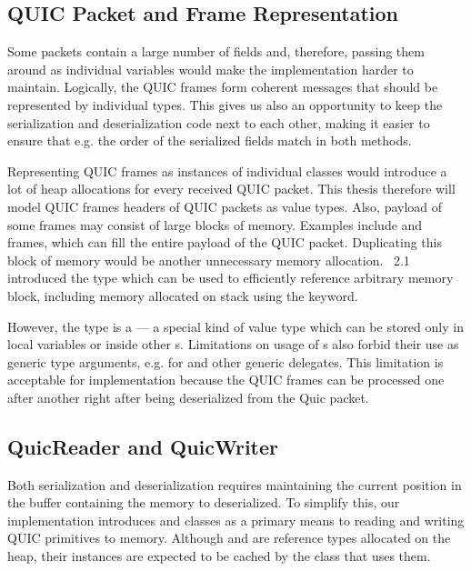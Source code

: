 \subsection{QUIC Packet and Frame Representation}\label{sec:03-data-representation}


Some packets contain a large number of fields and, therefore, passing them around as individual
variables would make the implementation harder to maintain. Logically, the QUIC frames form coherent
messages that should be represented by individual \dotnet{} types. This gives us also an opportunity to keep the serialization and deserialization code next to each other, making it easier to ensure that e.g. the order of the serialized fields match in both methods.

Representing QUIC frames as instances of individual classes would introduce a lot of heap
allocations for every received QUIC packet. This thesis therefore will model QUIC frames headers of
QUIC packets as value types. Also, payload of some frames may consist of large blocks of memory.
Examples include \STREAM{} and \CRYPTO{} frames, which can fill the entire payload of the QUIC
packet. Duplicating this block of memory would be another unnecessary memory allocation.
\dotnet{}~2.1 introduced the  type which can be used to efficiently reference
arbitrary memory block, including memory allocated on stack using the  keyword.

However, the  type is a  --- a special kind of value type which can
be stored only in local variables or inside other s. Limitations on usage of
s also forbid their use as generic type arguments, e.g. for  and
other generic delegates. This limitation is acceptable for \QuicConnection{} implementation because
the QUIC frames can be processed one after another right after being deserialized from the Quic
packet.

\subsection{QuicReader and QuicWriter}

Both serialization and deserialization requires maintaining the current position in the buffer
containing the memory to deserialized. To simplify this, our implementation introduces \QuicReader{}
and \QuicWriter{} classes as a primary means to reading and writing QUIC primitives to memory.
Although \QuicReader{} and \QuicWriter{} are reference types allocated on the heap, their instances
are expected to be cached by the class that uses them.

